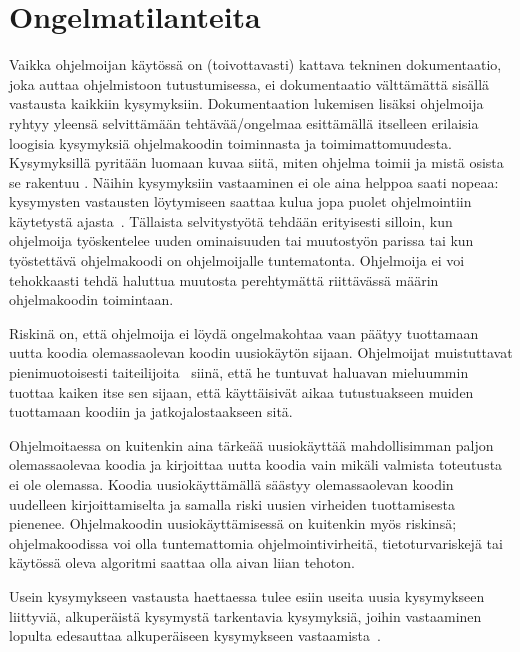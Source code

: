 \documentclass[finnish]{tktltiki2}
\theoremstyle{definition}
\theoremstyle{remark}
\begin{document}
\section{Ongelmatilanteita}

Vaikka ohjelmoijan käytössä on (toivottavasti) kattava tekninen dokumentaatio, joka auttaa ohjelmistoon tutustumisessa, ei dokumentaatio välttämättä sisällä vastausta kaikkiin kysymyksiin. Dokumentaation lukemisen lisäksi ohjelmoija ryhtyy yleensä selvittämään tehtävää/ongelmaa esittämällä itselleen erilaisia loogisia kysymyksiä ohjelmakoodin toiminnasta ja toimimattomuudesta. Kysymyksillä pyritään luomaan kuvaa siitä, miten ohjelma toimii ja mistä osista se rakentuu \cite{g_search_code, questions-during-software-evolution-tasks,asking-and-answering-api-questions}. Näihin kysymyksiin vastaaminen ei ole aina helppoa saati nopeaa: kysymysten vastausten löytymiseen saattaa kulua jopa puolet ohjelmointiin käytetystä ajasta~\cite{eliciting-design-requirements-for-maintenance-oriented-ides}.
Tällaista selvitystyötä tehdään erityisesti silloin, kun ohjelmoija työskentelee uuden ominaisuuden tai muutostyön parissa tai kun työstettävä ohjelmakoodi on ohjelmoijalle tuntematonta. Ohjelmoija ei voi tehokkaasti tehdä haluttua muutosta perehtymättä riittävässä määrin ohjelmakoodin toimintaan.

Riskinä on, että ohjelmoija ei löydä ongelmakohtaa vaan päätyy tuottamaan uutta koodia olemassaolevan koodin uusiokäytön sijaan.
Ohjelmoijat muistuttavat pienimuotoisesti taiteilijoita~\cite{hackers-and-painters} siinä, että he tuntuvat haluavan mieluummin tuottaa kaiken itse sen sijaan, että käyttäisivät aikaa tutustuakseen muiden tuottamaan koodiin ja jatkojalostaakseen sitä.

Ohjelmoitaessa on kuitenkin aina tärkeää uusiokäyttää mahdollisimman paljon olemassaolevaa koodia ja kirjoittaa uutta koodia vain mikäli valmista toteutusta ei ole olemassa. Koodia uusiokäyttämällä säästyy olemassaolevan koodin uudelleen kirjoittamiselta ja samalla riski uusien virheiden tuottamisesta pienenee. Ohjelmakoodin uusiokäyttämisessä on kuitenkin myös riskinsä; ohjelmakoodissa voi olla tuntemattomia ohjelmointivirheitä, tietoturvariskejä tai käytössä oleva algoritmi saattaa olla aivan liian tehoton.

Usein kysymykseen vastausta haettaessa tulee esiin useita uusia kysymykseen liittyviä, alkuperäistä kysymystä tarkentavia kysymyksiä, joihin vastaaminen lopulta edesauttaa alkuperäiseen kysymykseen vastaamista~\cite{questions-during-software-evolution-tasks}.
\end{document}
